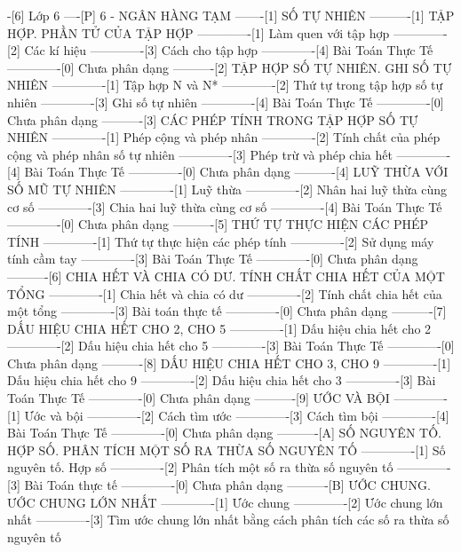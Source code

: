 -[6] Lớp 6
----[P] 6 - NGÂN HÀNG TẠM
-------[1] SỐ TỰ NHIÊN
----------[1] TẬP HỢP. PHẦN TỬ CỦA TẬP HỢP
-------------[1] Làm quen với tập hợp
-------------[2] Các kí hiệu
-------------[3] Cách cho tập hợp
-------------[4] Bài Toán Thực Tế
-------------[0] Chưa phân dạng
----------[2] TẬP HỢP SỐ TỰ NHIÊN. GHI SỐ TỰ NHIÊN
-------------[1] Tập hợp N và N*
-------------[2] Thứ tự trong tập hợp số tự nhiên
-------------[3] Ghi số tự nhiên
-------------[4] Bài Toán Thực Tế
-------------[0] Chưa phân dạng
----------[3] CÁC PHÉP TÍNH TRONG TẬP HỢP SỐ TỰ NHIÊN
-------------[1] Phép cộng và phép nhân
-------------[2] Tính chất của phép cộng và phép nhân số tự nhiên
-------------[3] Phép trừ và phép chia hết
-------------[4] Bài Toán Thực Tế
-------------[0] Chưa phân dạng
----------[4] LUỸ THỪA VỚI SỐ MŨ TỰ NHIÊN
-------------[1] Luỹ thừa
-------------[2] Nhân hai luỹ thừa cùng cơ số
-------------[3] Chia hai luỹ thừa cùng cơ số
-------------[4] Bài Toán Thực Tế
-------------[0] Chưa phân dạng
----------[5] THỨ TỰ THỰC HIỆN CÁC PHÉP TÍNH
-------------[1] Thứ tự thực hiện các phép tính
-------------[2] Sử dụng máy tính cầm tay
-------------[3] Bài Toán Thực Tế
-------------[0] Chưa phân dạng
----------[6] CHIA HẾT VÀ CHIA CÓ DƯ. TÍNH CHẤT CHIA HẾT CỦA MỘT TỔNG
-------------[1] Chia hết và chia có dư
-------------[2] Tính chất chia hết của một tổng
-------------[3] Bài toán thực tế
-------------[0] Chưa phân dạng
----------[7] DẤU HIỆU CHIA HẾT CHO 2, CHO 5
-------------[1] Dấu hiệu chia hết cho 2
-------------[2] Dấu hiệu chia hết cho 5
-------------[3] Bài Toán Thực Tế
-------------[0] Chưa phân dạng
----------[8] DẤU HIỆU CHIA HẾT CHO 3, CHO 9
-------------[1] Dấu hiệu chia hết cho 9
-------------[2] Dấu hiệu chia hết cho 3
-------------[3] Bài Toán Thực Tế
-------------[0] Chưa phân dạng
----------[9] ƯỚC VÀ BỘI
-------------[1] Ước và bội
-------------[2] Cách tìm ước
-------------[3] Cách tìm bội
-------------[4] Bài Toán Thực Tế
-------------[0] Chưa phân dạng
----------[A] SỐ NGUYÊN TỐ. HỢP SỐ. PHÂN TÍCH MỘT SỐ RA THỪA SỐ NGUYÊN TỐ
-------------[1] Số nguyên tố. Hợp số
-------------[2] Phân tích một số ra thừa số nguyên tố
-------------[3] Bài Toán thực tế
-------------[0] Chưa phân dạng
----------[B] ƯỚC CHUNG. ƯỚC CHUNG LỚN NHẤT
-------------[1] Ước chung
-------------[2] Ước chung lớn nhất
-------------[3] Tìm ước chung lớn nhất bằng cách phân tích các số ra thừa số nguyên tố
